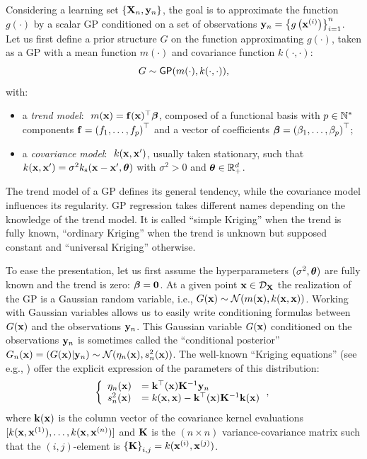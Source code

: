 Considering a learning set $\left\{{\bf X}_n, {\bf y}_n\right\}$, the goal is to approximate the function $g(\cdot)$ by a scalar GP conditioned on a set of observations ${\bf y}_n = \left\{g\left({\bf x}^{(i)}\right)\right\}_{i=1}^n$. 
Let us first define a prior structure $G$ on the function approximating $g(\cdot)$, taken as a GP with a mean function $m(\cdot)$ and covariance function $k(\cdot, \cdot)$:  
\begin{equation}
    G \sim \mathsf{GP}(m(\cdot), k(\cdot, \cdot)),
\end{equation} 
with: 
\begin{itemize}
    \item a \textit{trend model}: $~m({\bf x}) = \mathbf{f}({\bf x})^\top {\boldsymbol{\beta}}$, composed of a functional basis with $p \in \mathbb{N}^*$ components $\mathbf{f} = \left(f_1, \dots, f_p\right)^\top$ and a vector of coefficients 
    ${\boldsymbol{\beta}} = \left(\beta_1, \dots, \beta_p\right)^\top$;
    \item a \textit{covariance model}: $~k({\bf x}, {\bf x}')$, usually taken stationary, such that $k({\bf x}, {\bf x}') = \sigma^2 k_{\mathrm{s}}({\bf x} - {\bf x}', {\boldsymbol{\theta}})$ with $\sigma^2>0$ and ${\boldsymbol{\theta}} \in \mathbb{R}^d_+$.
\end{itemize}
The trend model of a GP defines its general tendency, while the covariance model influences its regularity. 
GP regression takes different names depending on the knowledge of the trend model. 
It is called ``simple Kriging'' when the trend is fully known, ``ordinary Kriging'' when the trend is unknown but supposed constant and ``universal Kriging'' otherwise. 

To ease the presentation, let us first assume the hyperparameters $(\sigma^2, {\boldsymbol{\theta}})$ are fully known and the trend is zero: ${\boldsymbol{\beta}} = \textbf{0}$. 
At a given point ${\bf x} \in \mathcal{D}_{\bf X}$ the realization of the GP is a Gaussian random variable, i.e.,  $G({\bf x}) \sim \mathcal{N}(m({\bf x}), k({\bf x}, {\bf x}))$. 
Working with Gaussian variables allows us to easily write conditioning formulas between $G({\bf x})$ and the observations ${\bf y}_n$. 
This Gaussian variable $G({\bf x})$ conditioned on the observations ${\bf y}_n$ is sometimes called the ``conditional posterior'' $G_n({\bf x}) = (G({\bf x}) | {\bf y}_n) \sim \mathcal{N}(\eta_n({\bf x}), s_n^2({\bf x}))$. 
The well-known ``Kriging equations'' (see e.g., \citealp{rasmussen_2006}) offer the explicit expression of the parameters of this distribution:
\begin{equation}
    \left\{
    \begin{array}{ll}
        \eta_n({\bf x}) &= {\bf k}^\top({\bf x}) {\bf K}^{-1} {\bf y}_n\\
        s_n^2({\bf x}) &= k({\bf x}, {\bf x}) - {\bf k}^\top({\bf x}) {\bf K}^{-1} {\bf k}({\bf x}) 
    \end{array}\, ,
\right.
\label{eq:kriging}
\end{equation}
where ${\bf k}({\bf x})$ is the column vector of the covariance kernel evaluations $[k({\bf x}, {\bf x}^{(1)}), \dots,\allowbreak k({\bf x}, {\bf x}^{(n)})]$ and ${\bf K}$ is the $(n \times n)$ 
variance-covariance matrix such that the $(i, j)$-element is $\left\{{\bf K} \right\}_{i, j}=k({\bf x}^{(i)}, {\bf x}^{(j)})$.

